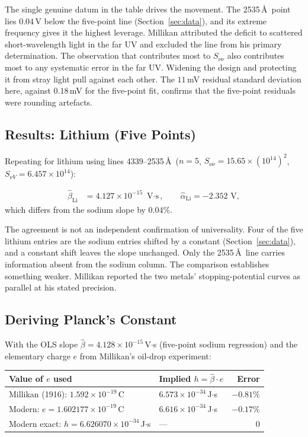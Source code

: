 \documentclass[12pt]{article}
\begin{document}
The single genuine datum in the table drives the movement.  The 2535\,\AA\
point lies $0.04$\,V below the five-point line (Section~\ref{sec:data}), and
its extreme frequency gives it the highest leverage.  Millikan attributed the
deficit to scattered short-wavelength light in the far UV and excluded the
line from his primary determination.  The observation that contributes most to
$S_{\nu\nu}$ also contributes most to any systematic error in the far UV.
Widening the design and protecting it from stray light pull against each
other.  The $11$\,mV residual standard deviation here, against $0.18$\,mV for
the five-point fit, confirms that the five-point residuals were rounding
artefacts.

\subsection{Results: Lithium (Five Points)}

Repeating for lithium using lines 4339--2535\,\AA\ ($n=5$,
$S_{\nu\nu} = 15.65\times(10^{14})^2$, $S_{\nu V} = 6.457\times10^{14}$):

\begin{align*}
  \hat\beta_{\mathrm{Li}} &= 4.127\times10^{-15}\text{ V$\cdot$s},
  \qquad \hat\alpha_{\mathrm{Li}} = -2.352\text{ V},
\end{align*}
which differs from the sodium slope by $0.04\%$.

The agreement is not an independent confirmation of universality.  Four of
the five lithium entries are the sodium entries shifted by a constant
(Section~\ref{sec:data}), and a constant shift leaves the slope unchanged.
Only the 2535\,\AA\ line carries information absent from the sodium column.
The comparison establishes something weaker.  Millikan reported the two
metals' stopping-potential curves as parallel at his stated precision.

\subsection{Deriving Planck's Constant}

With the OLS slope $\hat\beta = 4.128\times10^{-15}$\,V$\cdot$s (five-point
sodium regression) and the elementary charge $e$ from Millikan's oil-drop
experiment:

\begin{center}
\begin{tabular}{p{5.2cm}p{3.8cm}r}
\toprule
Value of $e$ used & Implied $h = \hat\beta \cdot e$ & Error \\
\midrule
Millikan (1916): $1.592\times10^{-19}$\,C
  & $6.573\times10^{-34}$\,J$\cdot$s & $-0.81\%$ \\
Modern: $e = 1.602177\times10^{-19}$\,C
  & $6.616\times10^{-34}$\,J$\cdot$s & $-0.17\%$ \\
Modern exact: $h = 6.626070\times10^{-34}$\,J$\cdot$s & --- & 0 \\
\bottomrule
\end{tabular}
\end{center}
\end{document}
